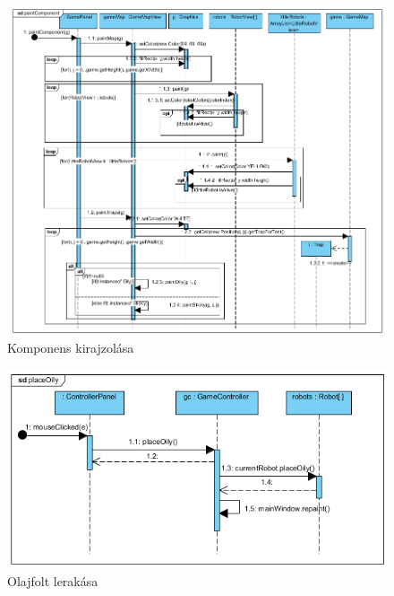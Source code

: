 \begin{figure}[h]
	\begin{center}
		\includegraphics[width=18cm]{chapters/chapter11/paintcomponent.png}
		\caption{Komponens kirajzolása}
		\label{fig:Grafika}
	\end{center}
\end{figure}

\clearpage

\begin{figure}[h]
	\begin{center}
		\includegraphics[width=14cm]{chapters/chapter11/placeoily.png}
		\caption{Olajfolt lerakása}
		\label{fig:Grafika}
	\end{center}
\end{figure}

